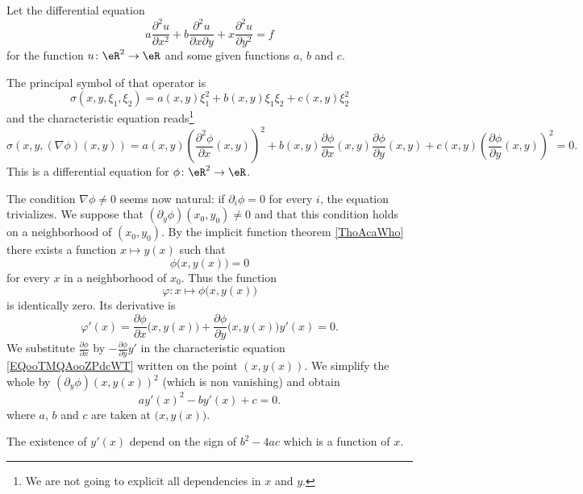 \begin{example}
    Let the differential equation
    \begin{equation}
        a\frac{ \partial^2u }{ \partial x^2 }+b\frac{ \partial^2u }{ \partial x\partial y }+x\frac{ \partial^2u }{ \partial y^2 }=f
    \end{equation}
    for the function \( u\colon \eR^2\to \eR\) and some given functions \( a\), \( b\) and \( c\).

    The principal symbol of that operator is
    \begin{equation}
        \sigma(x,y,\xi_1,\xi_2)=a(x,y)\xi_1^2+b(x,y)\xi_1\xi_2+c(x,y)\xi_2^2
    \end{equation}
    and the characteristic equation reads\footnote{We are not going to explicit all dependencies in \( x\) and \( y\).}
    \begin{equation}        \label{EQooTMQAooZPdcWT}
        \sigma(x,y,  (\nabla\phi)(x,y)   )=a(x,y)\left( \frac{ \partial^2\phi }{ \partial x }(x,y) \right)^2+b(x,y)\frac{ \partial \phi }{ \partial x }(x,y)\frac{ \partial \phi }{ \partial y }(x,y)+c(x,y)\left( \frac{ \partial \phi }{ \partial y }(x,y) \right)^2=0.
    \end{equation}
    This is a differential equation for \( \phi\colon \eR^2\to \eR\).

    The condition \( \nabla\phi\neq 0\) seems now natural: if \( \partial_i\phi=0\) for every \( i\), the equation trivializes. We suppose that \( (\partial_y\phi)(x_0,y_0)\neq 0\) and that this condition holds on a neighborhood of \( (x_0,y_0)\). By the implicit function theorem \ref{ThoAcaWho} there exists a function \( x\mapsto y(x)\) such that
    \begin{equation}
        \phi\big( x,y(x) \big)=0
    \end{equation}
    for every \( x\) in a neighborhood of \( x_0\). Thus the function
    \begin{equation}
        \varphi\colon x\mapsto \phi\big( x,y(x) \big)
    \end{equation}
    is identically zero. Its derivative is
    \begin{equation}
        \varphi'(x)=\frac{ \partial \phi }{ \partial x }\big( x,y(x) \big)+\frac{ \partial \phi }{ \partial y }\big( x,y(x) \big)y'(x)=0.
    \end{equation}
    We substitute \( \frac{ \partial \phi }{ \partial x }\) by \( -\frac{ \partial \phi }{ \partial y }y'\) in the characteristic equation \eqref{EQooTMQAooZPdcWT} written on the point \( (x,y(x))\).  We simplify the whole by \( (\partial_y\phi)(x,y(x))^2\) (which is non vanishing) and obtain
    \begin{equation}
        ay'(x)^2-by'(x)+c=0.
    \end{equation}
    where \( a\), \( b\) and \( c\) are taken at \( \big( x,y(x) \big)\).

    The existence of \( y'(x)\) depend on the sign of \( b^2-4ac\) which is a function of \( x\).

\end{example}

